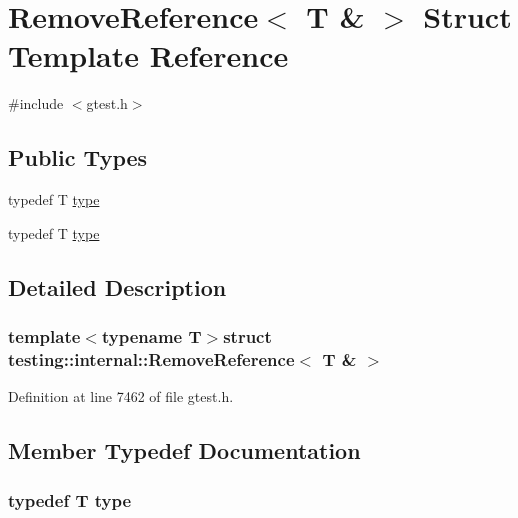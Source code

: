 \hypertarget{structtesting_1_1internal_1_1RemoveReference_3_01T_01_6_01_4}{\section{\-Remove\-Reference$<$ \-T \& $>$ \-Struct \-Template \-Reference}
\label{d1/d78/structtesting_1_1internal_1_1RemoveReference_3_01T_01_6_01_4}
}


{\ttfamily \#include $<$gtest.\-h$>$}

\subsection*{\-Public \-Types}
\begin{DoxyCompactItemize}
\item 
typedef \-T \hyperlink{structtesting_1_1internal_1_1RemoveReference_3_01T_01_6_01_4_a565429e62c1d4fd084335146ba778e17}{type}
\item 
typedef \-T \hyperlink{structtesting_1_1internal_1_1RemoveReference_3_01T_01_6_01_4_a565429e62c1d4fd084335146ba778e17}{type}
\end{DoxyCompactItemize}


\subsection{\-Detailed \-Description}
\subsubsection*{template$<$typename T$>$struct testing\-::internal\-::\-Remove\-Reference$<$ T \& $>$}



\-Definition at line 7462 of file gtest.\-h.



\subsection{\-Member \-Typedef \-Documentation}
\hypertarget{structtesting_1_1internal_1_1RemoveReference_3_01T_01_6_01_4_a565429e62c1d4fd084335146ba778e17}{
\subsubsection[{type}]{\setlength{\rightskip}{0pt plus 5cm}typedef \-T {\bf type}}}\label{d1/d78/structtesting_1_1internal_1_1RemoveReference_3_01T_01_6_01_4_a565429e62c1d4fd084335146ba778e17}


